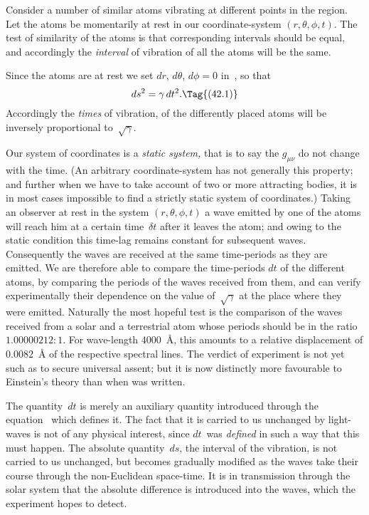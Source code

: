 \documentclass[12pt]{book}
\begin{document}
%
%
%
%

Consider a number of similar atoms vibrating at different points in the
region. Let the atoms be momentarily at rest in our coordinate\hyp{}system
$(r, \theta, \phi, t)$. The test of similarity of the atoms is that corresponding intervals
should be equal, and accordingly the \emph{interval} of vibration of all the atoms will
%
be the same.

Since the atoms are at rest we set $dr$, $d\theta$, $d\phi = 0$ in~, so that
\[
ds^{2} = \gamma\, dt^{2}.
\Tag{(42.1)}
\]
Accordingly the \emph{times} of vibration, of the differently placed atoms will be
inversely proportional to~$\sqrt{\gamma}$.

Our system of coordinates is a \emph{static system,} that is to say the $g_{\mu\nu}$ do not
change with the time. (An arbitrary coordinate\hyp{}system has not generally this
property; and further when we have to take account of two or more attracting
bodies, it is in most cases impossible to find a strictly static system of coordinates.)
Taking an observer at rest in the system $(r, \theta, \phi, t)$ a wave emitted
by one of the atoms will reach him at a certain time~$\delta t$ after it leaves the
atom; and owing to the static condition this time-lag remains constant for
subsequent waves. Consequently the waves are received at the same time\hyp{}periods
as they are emitted. We are therefore able to compare the time\hyp{}periods
$dt$ of the different atoms, by comparing the periods of the waves received from
them, and can verify experimentally their dependence on the value of~$\sqrt{\gamma}$ at
the place where they were emitted. Naturally the most hopeful test is the
comparison of the waves received from a solar and a terrestrial atom whose
periods should be in the ratio $1.00000212 : 1$. For wave-length $4000$~Å, this
amounts to a relative displacement of $0.0082$~Å of the respective spectral
lines. The verdict of experiment is not yet such as to secure universal assent;
but it is now distinctly more favourable to Einstein's theory than when  was written.

The quantity~$dt$ is merely an auxiliary quantity introduced through the
equation~ which defines it. The fact that it is carried to us unchanged
by light-waves is not of any physical interest, since $dt$~was \emph{defined} in such a
way that this must happen. The absolute quantity~$ds$, the interval of the
vibration, is not carried to us unchanged, but becomes gradually modified as
the waves take their course through the non\hyp{}Euclidean space-time. It is in
transmission through the solar system that the absolute difference is introduced
into the waves, which the experiment hopes to detect.
\end{document}
